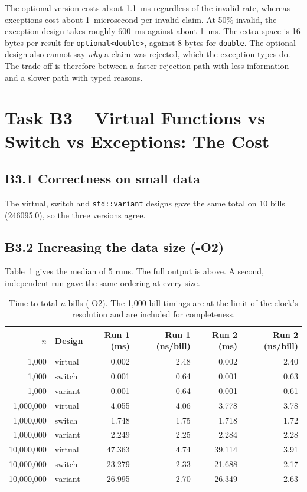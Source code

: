 \documentclass[11pt,a4paper]{article}
\newcommand{\lstout}[2]{}
\begin{document}
\noindent The optional version costs about 1.1~ms regardless of the invalid rate, whereas exceptions cost about 1~microsecond per invalid claim. At 50\% invalid, the exception design takes roughly 600~ms against about 1~ms. The extra space is 16 bytes per result for \texttt{optional<double>}, against 8 bytes for \texttt{double}. The optional design also cannot say \emph{why} a claim was rejected, which the exception types do. The trade-off is therefore between a faster rejection path with less information and a slower path with typed reasons.

\section{Task B3 -- Virtual Functions vs Switch vs Exceptions: The Cost}
\subsection*{B3.1 Correctness on small data}
\lstout{../Task05_Performance/bench_O2.out}{Full benchmark output (first part shows B3.1 correctness)}
The virtual, switch and \texttt{std::variant} designs gave the same total on 10 bills (246095.0), so the three versions agree.

\subsection*{B3.2 Increasing the data size (-O2)}
Table~\ref{tab:b32} gives the median of 5 runs. The full output is above. A second, independent run gave the same ordering at every size.

\begin{table}[H]
\centering
\small
\begin{tabular}{@{}rlrrrr@{}}
\toprule
\textbf{$n$} & \textbf{Design} & \textbf{Run 1 (ms)} & \textbf{Run 1 (ns/bill)} & \textbf{Run 2 (ms)} & \textbf{Run 2 (ns/bill)} \\
\midrule
1{,}000 & virtual & 0.002 & 2.48 & 0.002 & 2.40 \\
1{,}000 & switch & 0.001 & 0.64 & 0.001 & 0.63 \\
1{,}000 & variant & 0.001 & 0.64 & 0.001 & 0.61 \\
\midrule
1{,}000{,}000 & virtual & 4.055 & 4.06 & 3.778 & 3.78 \\
1{,}000{,}000 & switch & 1.748 & 1.75 & 1.718 & 1.72 \\
1{,}000{,}000 & variant & 2.249 & 2.25 & 2.284 & 2.28 \\
\midrule
10{,}000{,}000 & virtual & 47.363 & 4.74 & 39.114 & 3.91 \\
10{,}000{,}000 & switch & 23.279 & 2.33 & 21.688 & 2.17 \\
10{,}000{,}000 & variant & 26.995 & 2.70 & 26.349 & 2.63 \\
\bottomrule
\end{tabular}
\caption{Time to total $n$ bills (-O2). The 1{,}000-bill timings are at the limit of the clock's resolution and are included for completeness.}\label{tab:b32}
\end{table}
\end{document}
